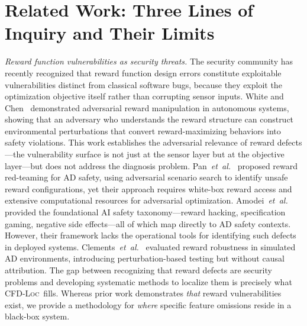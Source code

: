 \documentclass[journal]{IEEEtran}
\theoremstyle{plain}
\newcommand{\methodname}{\textsc{CFD-Loc}}
\begin{document}
\section{Related Work: Three Lines of Inquiry and Their Limits}

\emph{Reward function vulnerabilities as security threats.} The security community has recently recognized that reward function design errors constitute exploitable vulnerabilities distinct from classical software bugs, because they exploit the optimization objective itself rather than corrupting sensor inputs. White and Chen~\cite{white2023adversarial} demonstrated adversarial reward manipulation in autonomous systems, showing that an adversary who understands the reward structure can construct environmental perturbations that convert reward-maximizing behaviors into safety violations. This work establishes the adversarial relevance of reward defects---the vulnerability surface is not just at the sensor layer but at the objective layer---but does not address the diagnosis problem. Pan~\emph{et~al.}~\cite{pan2024reward} proposed reward red-teaming for AD safety, using adversarial scenario search to identify unsafe reward configurations, yet their approach requires white-box reward access and extensive computational resources for adversarial optimization. Amodei~\emph{et~al.}~\cite{amodei2016specification} provided the foundational AI safety taxonomy---reward hacking, specification gaming, negative side effects---all of which map directly to AD safety contexts. However, their framework lacks the operational tools for identifying such defects in deployed systems. Clements~\emph{et~al.}~\cite{clements2020rerl} evaluated reward robustness in simulated AD environments, introducing perturbation-based testing but without causal attribution. The gap between recognizing that reward defects are security problems and developing systematic methods to localize them is precisely what \methodname\ fills. Whereas prior work demonstrates \emph{that} reward vulnerabilities exist, we provide a methodology for \emph{where} specific feature omissions reside in a black-box system.
\end{document}
